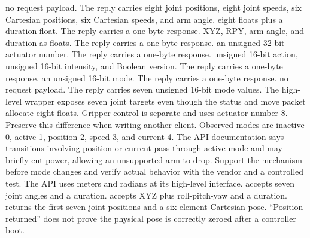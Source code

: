 {}\markdownRendererUlBegin
\markdownRendererUlItem {} no request payload. The reply carries eight joint positions, eight joint speeds, six Cartesian positions, six Cartesian speeds, and arm angle.\markdownRendererUlItemEnd 
\markdownRendererUlItem {} eight floats plus a duration float. The reply carries a one-byte response.\markdownRendererUlItemEnd 
\markdownRendererUlItem {} XYZ, RPY, arm angle, and duration as floats. The reply carries a one-byte response.\markdownRendererUlItemEnd 
\markdownRendererUlItem {} an unsigned 32-bit actuator number. The reply carries a one-byte response.\markdownRendererUlItemEnd 
\markdownRendererUlItem {} unsigned 16-bit action, unsigned 16-bit intensity, and Boolean version. The reply carries a one-byte response.\markdownRendererUlItemEnd 
\markdownRendererUlItem {} an unsigned 16-bit mode. The reply carries a one-byte response.\markdownRendererUlItemEnd 
\markdownRendererUlItem {} no request payload. The reply carries seven unsigned 16-bit mode values.\markdownRendererUlItemEnd 
\markdownRendererUlEnd \markdownRendererInterblockSeparator
{}The high-level wrapper exposes seven joint targets even though the status and move packet allocate eight floats. Gripper control is separate and uses actuator number 8. Preserve this difference when writing another client.\markdownRendererParagraphSeparator
{}Observed modes are inactive 0, active 1, position 2, speed 3, and current 4. The API documentation says transitions involving position or current pass through active mode and may briefly cut power, allowing an unsupported arm to drop. Support the mechanism before mode changes and verify actual behavior with the vendor and a controlled test.\markdownRendererParagraphSeparator
{}The API uses meters and radians at its high-level interface.  accepts seven joint angles and a duration.  accepts XYZ plus roll-pitch-yaw and a duration.  returns the first seven joint positions and a six-element Cartesian pose. “Position returned” does not prove the physical pose is correctly zeroed after a controller boot.\markdownRendererInterblockSeparator
